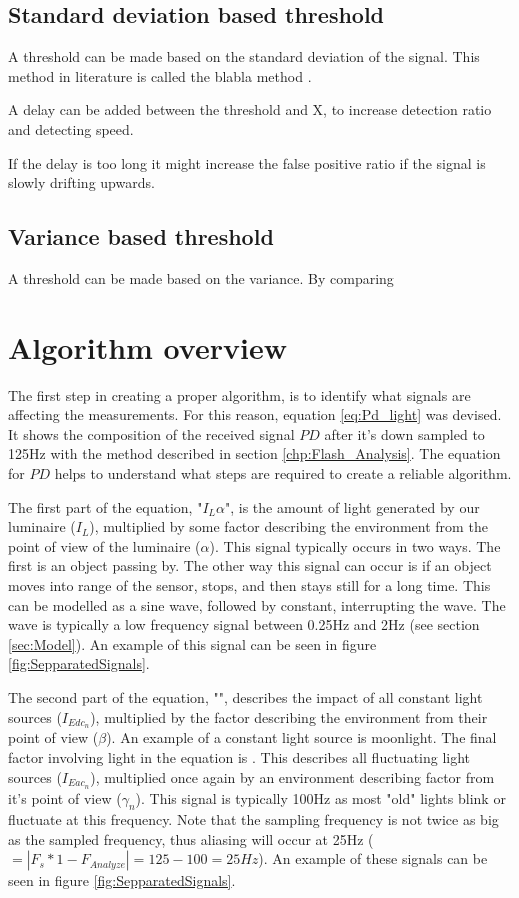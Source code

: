 \subsection{Standard deviation based threshold}
A threshold can be made based on the standard deviation of the signal. This method in literature is called the blabla method \cite{@}.

A delay can be added between the threshold and X, to increase detection ratio and detecting speed.

If the delay is too long it might increase the false positive ratio if the signal is slowly drifting upwards.

\subsection{Variance based threshold}
A threshold can be made based on the variance. By comparing 

\section{Algorithm overview}


The first step in creating a proper algorithm, is to identify what signals are affecting the measurements. For this reason, equation \ref{eq:Pd_light} was devised. It shows the composition of the received signal \textbf{$PD$} after it's down sampled to 125Hz with the method described in section \ref{chp:Flash_Analysis}. The equation for $PD$ helps to understand what steps are required to create a reliable algorithm.



The first part of the equation, "\textbf{$ I_{L} \alpha$}", is the amount of light generated by our luminaire ($I_{L}$), multiplied by some factor describing the environment from the point of view of the luminaire ($\alpha$). This signal typically occurs in two ways. The first is an object passing by. The other way this signal can occur is if an object moves into range of the sensor, stops, and then stays still for a long time. This can be modelled as a sine wave, followed by constant, interrupting the wave. The wave is typically a low frequency signal between 0.25Hz and 2Hz (see section \ref{sec:Model}). An example of this signal can be seen in figure \ref{fig:SepparatedSignals}.

The second part of the equation, "", describes the impact of all constant light sources ($I_{Edc_{n}}$), multiplied by the factor describing the environment from their point of view ($\beta$). An example of a constant light source is moonlight. The final factor involving light in the equation is . This describes all fluctuating light sources ($I_{Eac_{n}}$), multiplied once again by an environment describing factor from it's point of view ($\gamma_{n}$). This signal is typically 100Hz as most "old" lights blink or fluctuate at this frequency. Note that the sampling frequency is not twice as big as the sampled frequency, thus aliasing will occur at 25Hz ($= |F_{s} * 1 - F_{Analyze}| = 125 - 100 = 25Hz$)\cite{aliassing}. An example of these signals can be seen in figure \ref{fig:SepparatedSignals}.

